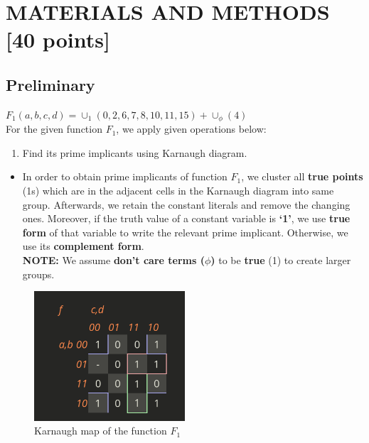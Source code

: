 \documentclass[pdftex,12pt,a4paper]{article}
\begin{document}
\section{MATERIALS AND METHODS [40 points]}



\subsection{Preliminary}

$ F_1 (a, b, c, d) = \cup_1 (0, 2, 6, 7, 8, 10, 11, 15) + \cup_{\phi} (4)$ \\
For the given function $F_1$, we apply given operations below:
\begin{enumerate}
    \item Find its prime implicants using Karnaugh diagram.
\end{enumerate}
\begin{itemize}
    \item In order to obtain prime implicants of function \textbf{$F_1$}, we cluster all \textbf{true points} (1s) which are in the adjacent cells in the Karnaugh diagram into same group. Afterwards, we retain the constant literals and remove the changing ones. Moreover, if the truth value of a constant variable is \textbf{‘1’}, we use \textbf{true form} of that variable to write the relevant prime implicant. Otherwise, we use its \textbf{complement form}.\\

    \textbf{NOTE:} We assume \textbf{don't care terms ($\phi$)} to be \textbf{true} (1) to create larger groups.
\end{itemize}

\begin{figure}[H]
    \centering
        \includegraphics[width=0.5\textwidth]{map1.png}	
        \caption{Karnaugh map of the function  $F_1$}
        \label{fig1}
\end{figure}
\end{document}
